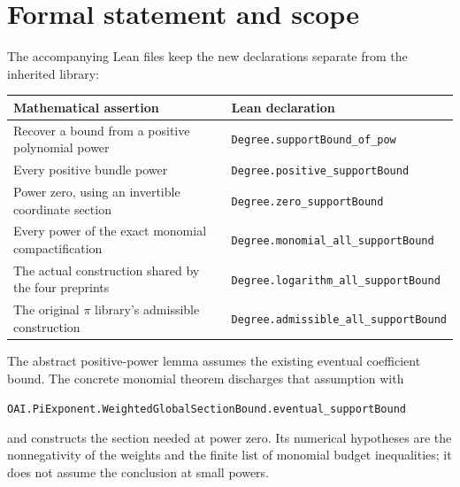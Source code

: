 \documentclass[11pt]{article}
\begin{document}
\section{Formal statement and scope}

The accompanying Lean files keep the new declarations separate from the inherited library:

\begin{center}\small\begin{tabularx}{\linewidth}{@{}X l@{}}\toprule

Mathematical assertion & Lean declaration \\

\midrule

Recover a bound from a positive polynomial power & \texttt{Degree.\allowbreak supportBound\_\allowbreak of\_\allowbreak pow} \\

Every positive bundle power & \texttt{Degree.\allowbreak positive\_\allowbreak supportBound} \\

Power zero, using an invertible coordinate section & \texttt{Degree.\allowbreak zero\_\allowbreak supportBound} \\

Every power of the exact monomial compactification & \texttt{Degree.\allowbreak monomial\_\allowbreak all\_\allowbreak supportBound} \\

The actual construction shared by the four preprints & \texttt{Degree.\allowbreak logarithm\_\allowbreak all\_\allowbreak supportBound} \\

The original $\pi$ library's admissible construction & \texttt{Degree.\allowbreak admissible\_\allowbreak all\_\allowbreak supportBound} \\

\bottomrule\end{tabularx}\end{center}

The abstract positive-power lemma assumes the existing eventual coefficient bound. The concrete monomial theorem discharges that assumption with \begin{center}\small\texttt{OAI.PiExponent.WeightedGlobalSectionBound.eventual\_supportBound}\end{center} and constructs the section needed at power zero. Its numerical hypotheses are the nonnegativity of the weights and the finite list of monomial budget inequalities; it does not assume the conclusion at small powers.
\end{document}
